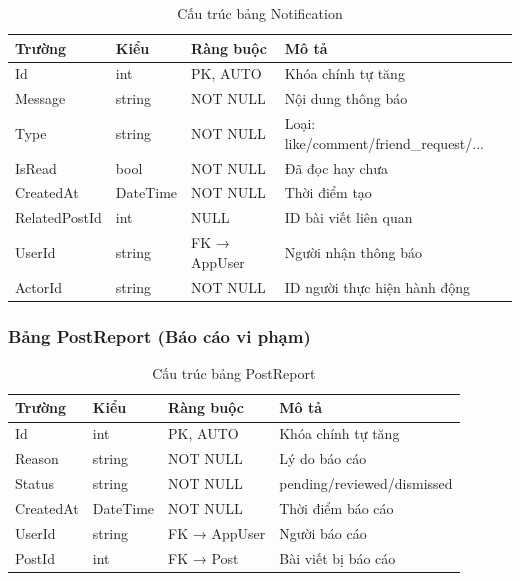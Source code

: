 \documentclass[a4paper]{article}
\begin{document}
\begin{table}[h!]
\centering
\caption{Cấu trúc bảng Notification}
\begin{tabularx}{\textwidth}{|l|l|l|X|}
\hline
\textbf{Trường} & \textbf{Kiểu} & \textbf{Ràng buộc} & \textbf{Mô tả} \\
\hline
Id & int & PK, AUTO & Khóa chính tự tăng \\
\hline
Message & string & NOT NULL & Nội dung thông báo \\
\hline
Type & string & NOT NULL & Loại: like/comment/friend\_request/... \\
\hline
IsRead & bool & NOT NULL & Đã đọc hay chưa \\
\hline
CreatedAt & DateTime & NOT NULL & Thời điểm tạo \\
\hline
RelatedPostId & int & NULL & ID bài viết liên quan \\
\hline
UserId & string & FK → AppUser & Người nhận thông báo \\
\hline
ActorId & string & NOT NULL & ID người thực hiện hành động \\
\hline
\end{tabularx}
\end{table}

\subsubsection{Bảng PostReport (Báo cáo vi phạm)}

\begin{table}[h!]
\centering
\caption{Cấu trúc bảng PostReport}
\begin{tabularx}{\textwidth}{|l|l|l|X|}
\hline
\textbf{Trường} & \textbf{Kiểu} & \textbf{Ràng buộc} & \textbf{Mô tả} \\
\hline
Id & int & PK, AUTO & Khóa chính tự tăng \\
\hline
Reason & string & NOT NULL & Lý do báo cáo \\
\hline
Status & string & NOT NULL & pending/reviewed/dismissed \\
\hline
CreatedAt & DateTime & NOT NULL & Thời điểm báo cáo \\
\hline
UserId & string & FK → AppUser & Người báo cáo \\
\hline
PostId & int & FK → Post & Bài viết bị báo cáo \\
\hline
\end{tabularx}
\end{table}

\newpage
\end{document}
